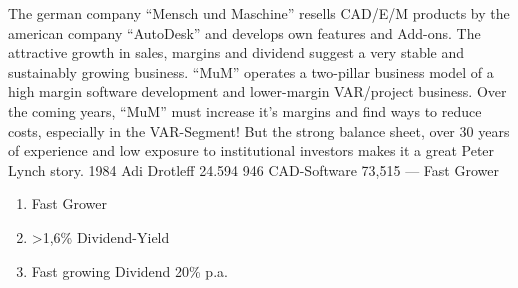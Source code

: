 \documentclass{company_analysis}
\begin{document}


\story
    {The german company \enquote{Mensch und Maschine} resells CAD/E/M
    products by the american company \enquote{AutoDesk} and develops
    own features and Add-ons. The attractive growth in sales, margins
    and dividend suggest a very stable and sustainably growing business.
    \enquote{MuM} operates a two-pillar business model of a high margin
    software development and lower-margin VAR/project business.
    Over the coming years, \enquote{MuM} must increase it's margins
    and find ways to reduce costs, especially in the VAR-Segment!
    But the strong balance sheet, over 30 years of experience and low
    exposure to institutional investors makes it a great Peter Lynch story.}\hfill
\infosection
    {1984}
    {Adi Drotleff}
    {24.594}
    {946}
    {CAD-Software}
    {73,515}
    {---}
    {Fast Grower}
    {\begin{enumerate}[leftmargin=0.8em, labelsep=0.2em]
        \item Fast Grower
        \item \textgreater 1,6\% Dividend-Yield
        \item Fast growing Dividend 20\% p.a.
    \end{enumerate}\vspace{-0.5cm}
    }

\begin{figure}[h!]
\end{figure}


\end{document}
